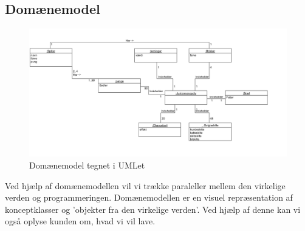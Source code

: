     \subsection{Domænemodel}
        \begin{figure}[h]
            \advance\leftskip-3cm
            \includegraphics[width=20cm]{fig/domainemodel.PNG}
            \caption{Domænemodel tegnet i UMLet}
        \end{figure}
    Ved hjælp af domænemodellen vil vi trække paraleller mellem den virkelige
    verden og programmeringen. Domænemodellen er en visuel repræsentation af 
    konceptklasser og 'objekter fra den virkelige verden'. Ved hjælp af denne
    kan vi også oplyse kunden om, hvad vi vil lave.
